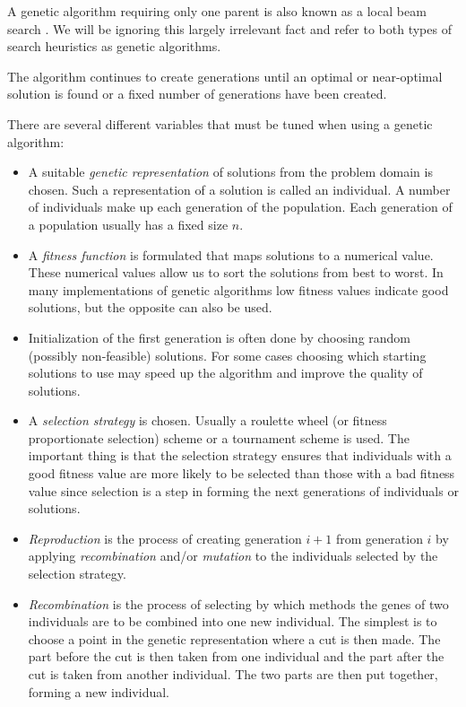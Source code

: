 A genetic algorithm requiring only one parent is also known as a local
beam search \cite{russel}. We will be ignoring this largely irrelevant
fact and refer to both types of search heuristics as genetic
algorithms.

The algorithm continues to create generations until an optimal or
near-optimal solution is found or a fixed number of generations have
been created.

There are several different variables that must be tuned when using a
genetic algorithm:
\begin{itemize}
\item A suitable \emph{genetic representation} of solutions from the
problem domain is chosen. Such a representation of a solution is
called an individual. A number of individuals make up each generation of
the population. Each generation of a population usually has a fixed size $n$.

\item A \emph{fitness function} is formulated that maps solutions to a
numerical value. These numerical values allow us to sort the solutions
from best to worst. In many implementations of genetic algorithms low
fitness values indicate good solutions, but the opposite can also be
used.

\item Initialization of the first generation is often done by choosing
random (possibly non-feasible) solutions. For some cases choosing
which starting solutions to use may speed up the algorithm and improve
the quality of solutions. 
 
\item A \emph{selection strategy} is chosen. Usually a roulette wheel
(or fitness proportionate selection) scheme or a tournament scheme is
used. The important thing is that the selection strategy ensures that
individuals with a good fitness value are more likely to be selected
than those with a bad fitness value since selection is a step in
forming the next generations of individuals or solutions.

\item \emph{Reproduction} is the process of creating generation $i+1$
from generation $i$ by applying \emph{recombination} and/or
\emph{mutation} to the individuals selected by the selection strategy.

\item \emph{Recombination} is the process of selecting by which
  methods the genes of two individuals are to be combined into one new
  individual. The simplest is to choose a point in the genetic
  representation where a cut is then made. The part before the cut is
  then taken from one individual and the part after the cut is taken
  from another individual. The two parts are then put together,
  forming a new individual.


\end{itemize}
